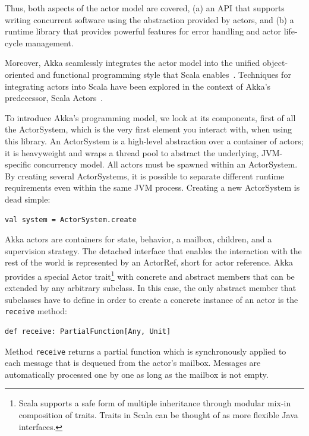 \documentclass{sig-alternate}
\begin{document}
Thus, both aspects of the actor model are covered, (a) an API that supports writing concurrent software using the abstraction provided by actors, and (b) a runtime library that provides powerful features for error handling and actor life-cycle management.

Moreover, Akka seamlessly integrates the actor model into the unified object-oriented and functional programming style that Scala enables~\cite{OderskyR14}. Techniques for integrating actors into Scala have been explored in the context of Akka's predecessor, Scala Actors~\cite{HallerO09}.

To introduce Akka's programming model, we look at its components, first of all the ActorSystem, which is the very first element you interact with, when using this library.
An ActorSystem is a high-level abstraction over a container of actors; it is heavyweight and wraps a thread pool to abstract the underlying, JVM-specific concurrency model.
All actors must be spawned within an ActorSystem. By creating several ActorSystems, it is possible to separate different runtime requirements even within the same JVM process.
Creating a new ActorSystem is dead simple:
\begin{lstlisting}
val system = ActorSystem.create
\end{lstlisting}
\noindent
Akka actors are containers for state, behavior, a mailbox, children, and a supervision strategy. The detached interface that enables the interaction with the rest of the world is represented by an ActorRef, short for actor reference.
Akka provides a special Actor trait\footnote{Scala supports a safe form of multiple inheritance through modular mix-in composition of traits. Traits in Scala can be thought of as more flexible Java interfaces.} with concrete and abstract members that can be extended by any arbitrary subclass.
In this case, the only abstract member that subclasses have to define in order to create a concrete instance of an actor is the \verb|receive| method:
\begin{lstlisting}
def receive: PartialFunction[Any, Unit]
\end{lstlisting}
\noindent
Method \verb|receive| returns a partial function which is synchronously applied to each message that is dequeued from the actor's mailbox. Messages are automatically processed one by one as long as the mailbox is not empty.
\end{document}
